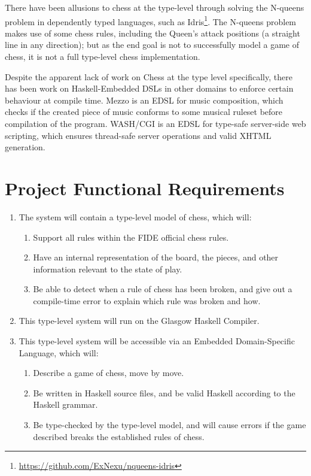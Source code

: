 \documentclass[12pt, a4paper]{scrartcl}
\begin{document}
There have been allusions to chess at the type-level through solving the N-queens problem in dependently typed languages, such as Idris\cite{idrisnqueens}\footnote{\url{https://github.com/ExNexu/nqueens-idris}}. The N-queens problem makes use of some chess rules, including the Queen's attack positions (a straight line in any direction); but as the end goal is not to successfully model a game of chess, it is not a full type-level chess implementation.

Despite the apparent lack of work on Chess at the type level specifically, there has been work on Haskell-Embedded DSLs in other domains to enforce certain behaviour at compile time. Mezzo\cite{mezzo} is an EDSL for music composition, which checks if the created piece of music conforms to some musical ruleset before compilation of the program. WASH/CGI\cite{washcgi} is an EDSL for type-safe server-side web scripting, which ensures thread-safe server operations and valid XHTML generation.

\section{Project Functional Requirements}

\begin{enumerate}
    \item The system will contain a type-level model of chess, which will:
          \begin{enumerate}
              \item Support all rules within the FIDE official chess rules.
              \item Have an internal representation of the board, the pieces, and other information relevant to the state of play.
              \item Be able to detect when a rule of chess has been broken, and give out a compile-time error to explain which rule was broken and how.
          \end{enumerate}
    \item This type-level system will run on the Glasgow Haskell Compiler.
    \item This type-level system will be accessible via an Embedded Domain-Specific Language, which will:
          \begin{enumerate}
              \item Describe a game of chess, move by move.
              \item Be written in Haskell source files, and be valid Haskell according to the Haskell grammar.
              \item Be type-checked by the type-level model, and will cause errors if the game described breaks the established rules of chess.
          \end{enumerate}
\end{enumerate}
\end{document}
